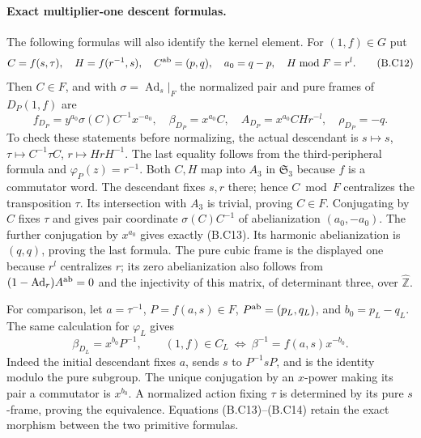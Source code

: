\paragraph{Exact multiplier-one descent formulas.}
The following formulas will also identify the kernel element.
For $(1,f)\in G$ put
\[
 C=f(s,\tau),\quad H=f(r^{-1},s),\quad
 C^{\rm ab}=(p,q),\quad a_0=q-p,\quad H\bmod F=r^l.
 \tag{B.C12}
\]
Then $C\in F$, and with
$\sigma=\operatorname{Ad}_s|_F$ the normalized pair and pure
frames of $D_P(1,f)$ are
\[
 f_{D_P}=y^{a_0}\sigma(C)C^{-1}x^{-a_0},\quad
 \beta_{D_P}=x^{a_0}C,\quad
 A_{D_P}=x^{a_0}CHr^{-l},\quad \rho_{D_P}=-q.
 \tag{B.C13}
\]
To check these statements before normalizing, the actual
descendant is
$s\mapsto s$, $\tau\mapsto C^{-1}\tau C$,
$r\mapsto HrH^{-1}$.  The last equality follows from the
third-peripheral formula and $\varphi_P(z)=r^{-1}$.
Both $C,H$ map into $A_3$ in $\mathfrak S_3$ because $f$ is
a commutator word.  The descendant fixes $s,r$ there; hence
$C\bmod F$ centralizes the transposition $\tau$.  Its
intersection with $A_3$ is trivial, proving $C\in F$.
Conjugating by $C$ fixes $\tau$ and gives pair coordinate
$\sigma(C)C^{-1}$ of abelianization $(a_0,-a_0)$.
The further conjugation by $x^{a_0}$ gives exactly (B.C13).
Its harmonic abelianization is $(q,q)$, proving the last
formula.  The pure cubic frame is the displayed one because
$r^l$ centralizes $r$; its zero abelianization also follows
from $(1-\operatorname{Ad}_r)A^{\rm ab}=0$ and the
injectivity of this matrix, of determinant three, over
$\widehat{\mathbb Z}$.

For comparison, let $a=\tau^{-1}$,
$P=f(a,s)\in F$, $P^{\rm ab}=(p_L,q_L)$, and
$b_0=p_L-q_L$.  The same calculation for $\varphi_L$ gives
\[
 \beta_{D_L}=x^{b_0}P^{-1},\qquad
 (1,f)\in C_L\ \Longleftrightarrow\
          \beta^{-1}=f(a,s)x^{-b_0}.
 \tag{B.C14}
\]
Indeed the initial descendant fixes $a$, sends
$s$ to $P^{-1}sP$, and is the identity modulo the pure
subgroup.  The unique conjugation by an $x$-power making
its pair a commutator is $x^{b_0}$.  A normalized action
fixing $\tau$ is determined by its pure $s$-frame, proving
the equivalence.  Equations (B.C13)--(B.C14) retain the exact
morphism between the two primitive formulas.

